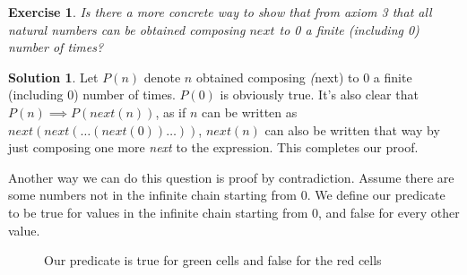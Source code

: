 \documentclass[a4paper,10pt]{article}
\newtheorem{exercise}{Exercise}[section]
\theoremstyle{definition} %
\newtheorem*{solution}{Solution}
\begin{document}
    \begin{exercise}
        Is there a more concrete way to show that from axiom 3 that all natural numbers
        can be obtained composing $next$ to 0 a finite (including 0) number of times?
    \end{exercise}
    \begin{solution}
        Let $P(n)$ denote $n$ obtained composing \emph(next) to 0 a finite (including 0) 
        number of times. $P(0)$ is obviously true. It's also clear that $P(n) \implies P(next(n))$,
        as if $n$ can be written as $next(next(\dots(next(0))\dots))$, $next(n)$ can also be written
        that way by just composing one more \emph{next} to the expression. 
        This completes our proof.

        Another way we can do this question is proof by contradiction.
        Assume there are some numbers not in the infinite chain starting from 0.
        We define our predicate to be true for values in the infinite chain starting
        from 0, and false for every other value.

        \begin{figure}[ht]
            \centering
            \caption{Our predicate is true for green cells and false for the red cells}
            \end{figure}
    \end{solution}
\end{document}
